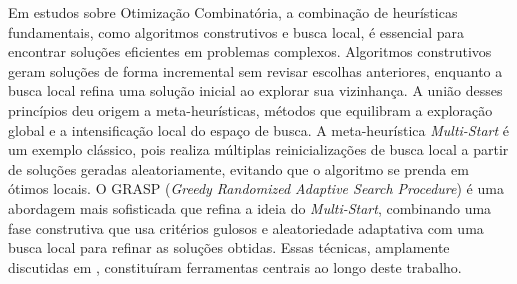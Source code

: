 Em estudos sobre Otimização Combinatória, a combinação de heurísticas fundamentais, como algoritmos construtivos e busca local, é essencial para encontrar soluções eficientes em problemas complexos. Algoritmos construtivos geram soluções de forma incremental sem revisar escolhas anteriores, enquanto a busca local refina uma solução inicial ao explorar sua vizinhança. A união desses princípios deu origem a meta-heurísticas, métodos que equilibram a exploração global e a intensificação local do espaço de busca. A meta-heurística \textit{Multi-Start} é um exemplo clássico, pois realiza múltiplas reinicializações de busca local a partir de soluções geradas aleatoriamente, evitando que o algoritmo se prenda em ótimos locais. O GRASP (\textit{Greedy Randomized Adaptive Search Procedure}) é uma abordagem mais sofisticada que refina a ideia do \textit{Multi-Start}, combinando uma fase construtiva que usa critérios gulosos e aleatoriedade adaptativa com uma busca local para refinar as soluções obtidas. Essas técnicas, amplamente discutidas em \cite{metaheuristicas2003}, constituíram ferramentas centrais ao longo deste trabalho.
